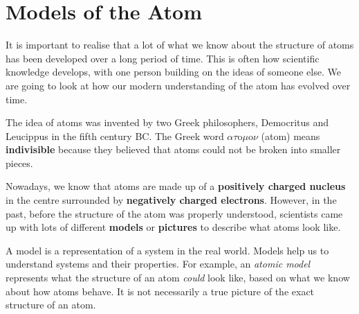             \section{Models of the Atom}
            \nopagebreak
      \label{m38756*id254164}It is important to realise that a lot of what we know about the structure of atoms has been developed over a long period of time. This is often how scientific knowledge develops, with one person building on the ideas of someone else. We are going to look at how our modern understanding of the atom has evolved over time.\par 
      \label{m38756*id254508}The idea of atoms was invented by two Greek philosophers, Democritus and Leucippus in the fifth century BC. The Greek word $\alpha \tau \text{o}\mu \text{o}\nu$ (atom) means \textbf{indivisible} because they believed that atoms could not be broken into smaller pieces.\par 
      \label{m38756*id254540}Nowadays, we know that atoms are made up of a \textbf{positively charged nucleus} in the centre
surrounded by \textbf{negatively charged electrons}. However, in the past, before the structure of the atom was properly understood, scientists came up with lots of different \textbf{models} or \textbf{pictures} to describe what atoms look like.\par 

 { \label{m38756*meaningfhsst!!!underscore!!!id72}
      \label{m38756*id254584}A model is a representation of a system in the real world. Models help us to understand systems and their properties. For example, an \textsl{atomic model} represents what the structure of an atom \textsl{could} look like, based on what we know about how atoms behave. It is not necessarily a true picture of the exact structure of an atom. \par 
       } 
